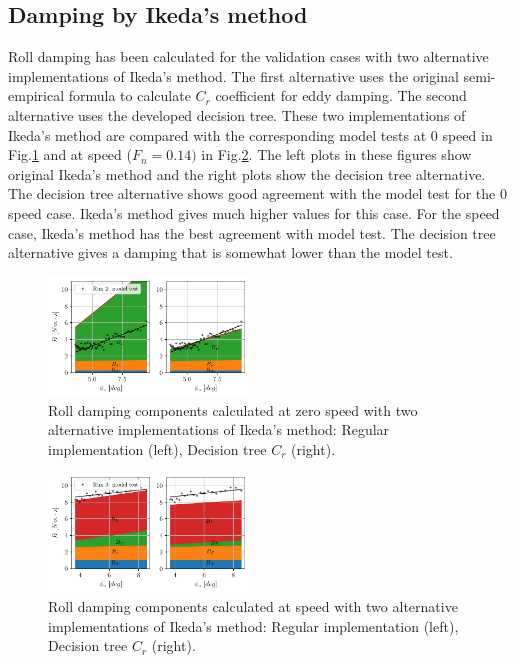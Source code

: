 \subsection*{Damping by Ikeda's method}\label{damping-by-ikedas-method}
Roll damping has been calculated for the validation cases with two
alternative implementations of Ikeda's method. The first alternative
uses the original semi-empirical formula to calculate $C_r$
coefficient for eddy damping. The second alternative uses the developed
decision tree. These two implementations of Ikeda's method are compared
with the corresponding model tests at 0 speed in
Fig.\ref{fig:ikeda} and at speed ($F_n=0.14)$ in
Fig.\ref{fig:ikeda_speed}. The left plots in these figures show
original Ikeda's method and the right plots show the decision tree
alternative. The decision tree alternative shows good agreement with the
model test for the 0 speed case. Ikeda's method gives much higher values
for this case. For the speed case, Ikeda's method has the best agreement
with model test. The decision tree alternative gives a damping that is
somewhat lower than the model test.
\begin{figure}[H]
\begin{center}\includegraphics[width = 0.475\textwidth]{figures/ikeda.pdf}\end{center}
\vspace{-0.7cm}
\caption{Roll damping components calculated at zero speed with two alternative implementations of Ikeda's method: Regular implementation (left), Decision tree $C_r$ (right).}
\label{fig:ikeda}
\end{figure}
\begin{figure}[H]
\begin{center}\includegraphics[width = 0.475\textwidth]{figures/ikeda_speed.pdf}\end{center}
\vspace{-0.7cm}
\caption{Roll damping components calculated at speed with two alternative implementations of Ikeda's method: Regular implementation (left), Decision tree $C_r$ (right).}
\label{fig:ikeda_speed}
\end{figure}
